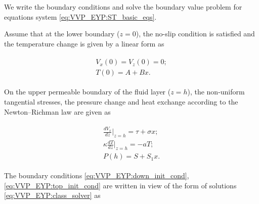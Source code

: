 We write the boundary conditions and solve the boundary value problem for equations system \eqref{eq:VVP_EYP:ST_basic_eqs}. 

Assume that at the lower boundary ($z=0$), the no-slip condition is satisfied and the temperature change is given by a linear form as

\begin{gather}

       \label{eq:VVP_EYP:down_init_cond}

       \begin{array}{c}

V_x\left(0\right)=V_z\left(0\right)=0; 

\\

T\left(0\right)=A+Bx.

       \end{array}

 \end{gather}

On the upper permeable boundary of the fluid layer ($z=h$), the non-uniform tangential stresses, the pressure change and heat exchange according to the Newton--Richman law are given as \cite{ulg:bib:Gershuni}

 \begin{gather}

       \label{eq:VVP_EYP:top_init_cond}

       \begin{array}{c}

       \displaystyle

\frac{dV_x}{dz}\Bigr|_{z=h}=\tau + \sigma x;

\\[2mm]

       \displaystyle

\kappa \frac{dT}{dz}\Bigr|_{z=h}=-aT;

\\[2mm]

P (h) =S+S_1 x.

       \end{array}

 \end{gather}

The boundary conditions \eqref{eq:VVP_EYP:down_init_cond}, \eqref{eq:VVP_EYP:top_init_cond} are written in view of the form of solutions \eqref{eq:VVP_EYP:class_solver} as 

